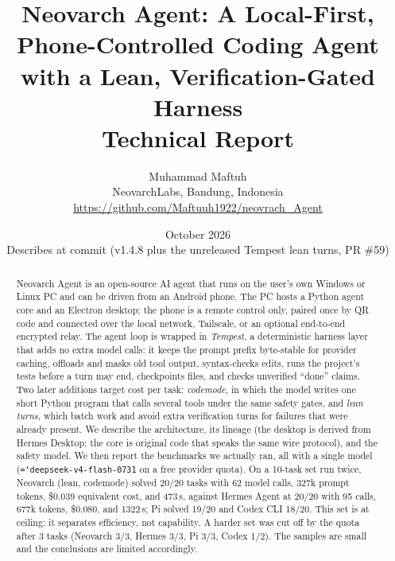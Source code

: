 \documentclass[11pt]{article}
\title{\textbf{Neovarch Agent: A Local-First, Phone-Controlled Coding Agent\\with a Lean, Verification-Gated Harness}\\[4pt]
\large Technical Report}
\author{Muhammad Maftuh\\
NeovarchLabs, Bandung, Indonesia\\
\small\url{https://github.com/Maftuuh1922/neovrach_Agent}}
\date{October 2026\\\small Describes \code{main} at commit \code{88a67fc} (v1.4.8 plus the unreleased Tempest lean turns, PR \#59)}
\newcommand{\code}[1]{\texttt{\hyphenchar\font=`\-\relax #1}}
\begin{document}
\maketitle

\begin{abstract}
\noindent Neovarch Agent is an open-source AI agent that runs on the user's own Windows or Linux PC and can be driven
from an Android phone. The PC hosts a Python agent core and an Electron desktop; the phone is a remote control
only, paired once by QR code and connected over the local network, Tailscale, or an optional end-to-end encrypted
relay. The agent loop is wrapped in \emph{Tempest}, a deterministic harness layer that adds no extra model calls: it keeps the
prompt prefix byte-stable for provider caching, offloads and masks old tool output, syntax-checks edits, runs the project's tests
before a turn may end, checkpoints files, and checks unverified ``done'' claims. Two later additions target cost per task:
\emph{codemode}, in which the model writes one short Python program that calls several tools under the same safety gates,
and \emph{lean turns}, which batch work and avoid extra verification turns for failures that were already present. We describe the architecture,
its lineage (the desktop is derived from Hermes Desktop; the core is original code that speaks the same wire protocol),
and the safety model. We then report the benchmarks we actually ran, all with a single model (\code{deepseek-v4-flash-0731}
on a free provider quota). On a 10-task set run twice, Neovarch (lean, codemode) solved 20/20 tasks with 62 model calls,
327k prompt tokens, \$0.039 equivalent cost, and 473\,s, against Hermes Agent at 20/20 with 95 calls, 677k tokens, \$0.080, and 1322\,s;
Pi solved 19/20 and Codex CLI 18/20. This set is at ceiling: it separates efficiency, not capability. A harder set was cut off by the
quota after 3 tasks (Neovarch 3/3, Hermes 3/3, Pi 3/3, Codex 1/2). The samples are small and the conclusions are limited accordingly.
\end{abstract}
\end{document}
